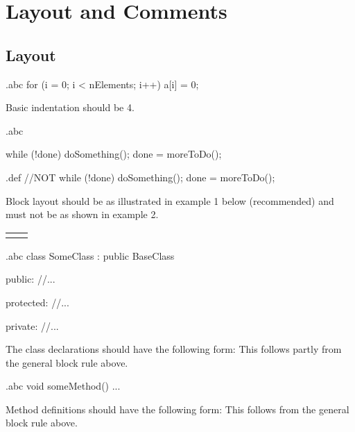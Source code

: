 \section{Layout and Comments}
\subsection{Layout}

\begin{filecontents*}{\jobname.abc}
    for (i = 0; i < nElements; i++)
        a[i] = 0;
\end{filecontents*}

\recommendation
{Basic indentation should be 4.}
{}
{}


\begin{filecontents*}{\jobname.abc}
	
	while (!done) {
	    doSomething();
	    done = moreToDo();
	}
\end{filecontents*}

\begin{filecontents*}{\jobname.def}
	//NOT
	while (!done)
	{
	    doSomething();
	    done = moreToDo();
	}
\end{filecontents*}

\recommendation
{Block layout should be as illustrated in example 1 below (recommended) and must not be as shown in example 2.}
{
	\begin{tabularx}{\linewidth}{p{.5\linewidth} p{.5\linewidth}}
		&
		
	\end{tabularx}
}
{}


\begin{filecontents*}{\jobname.abc}
	class SomeClass : public BaseClass
	{
		public:
		//...
		
		protected:
		//...
		
		private:
		//...
	}
\end{filecontents*}

\recommendation
{The class declarations should have the following form:}
{}
{This follows partly from the general block rule above.}


\begin{filecontents*}{\jobname.abc}
	void someMethod()
	{
		...
	}
\end{filecontents*}

\recommendation
{Method definitions should have the following form:}
{}
{This follows from the general block rule above.}

